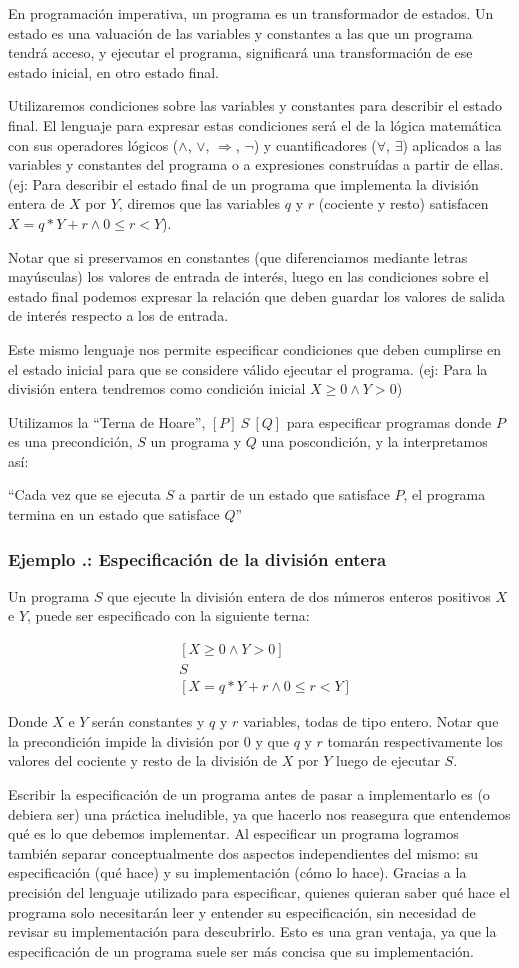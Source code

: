 \documentclass[12pt, a4paper, openany, fleqn]{book}
\newcounter{example}[chapter]
\renewcommand{\theexample}{\thechapter.\arabic{example}}
\newcommand{\example}[1]{
  \refstepcounter{example} %
  \subsubsection*{Ejemplo \theexample: #1}
}
\newcommand{\hoare}[3]{\ensuremath{[#1]\ #2\ [#3]}}
\newcommand{\verticalHoare}[3]{
    \begin{align*}
        &[#1]\\
        &#2\\
        &[#3]
    \end{align*}
}
\begin{document}
    En programación imperativa, un programa es un transformador de estados. Un estado es una valuación de las variables y constantes a las que un programa tendrá acceso, y ejecutar el programa, significará una transformación de ese estado inicial, en otro estado final.

    Utilizaremos condiciones sobre las variables y constantes para describir el estado final.
    El lenguaje para expresar estas condiciones será el de la lógica matemática con sus operadores lógicos ($\land$, $\lor$, $\Rightarrow$, $\neg$) y cuantificadores ($\forall$, $\exists$) aplicados a las variables y constantes del programa o a expresiones construídas a partir de ellas. (ej: Para describir el estado final de un programa que implementa la división entera de $X$ por $Y$, diremos que las variables $q$ y $r$ (cociente y resto) satisfacen $X = q * Y + r \land 0 \leqslant r < Y$).

    Notar que si preservamos en constantes (que diferenciamos mediante letras mayúsculas) los valores de entrada de interés, luego en las condiciones sobre el estado final podemos expresar la relación que deben guardar los valores de salida de interés respecto a los de entrada.

    Este mismo lenguaje nos permite especificar condiciones que deben cumplirse en el estado inicial para que se considere válido ejecutar el programa. (ej: Para la división entera tendremos como condición inicial $X \geqslant 0 \land Y > 0$)

    Utilizamos la ``Terna de Hoare'', \hoare{P}{S}{Q} para especificar programas donde $P$ es una precondición, $S$ un programa y $Q$ una poscondición, y la interpretamos así:

    ``Cada vez que se ejecuta $S$ a partir de un estado que satisface $P$, el programa termina en un estado que satisface $Q$''

    \example{Especificación de la división entera}
    \label{esp:division-entera}

    Un programa $S$ que ejecute la división entera de dos números enteros positivos $X$ e $Y$, puede ser especificado con la siguiente terna:
    \verticalHoare{X \geqslant 0 \land Y > 0}{S}{X = q * Y + r \land 0 \leqslant r < Y}
    Donde $X$ e $Y$ serán constantes y $q$ y $r$ variables, todas de tipo entero.
    Notar que la precondición impide la división por $0$ y que $q$ y $r$ tomarán respectivamente los valores del cociente y resto de la división de $X$ por $Y$ luego de ejecutar $S$.

    Escribir la especificación de un programa antes de pasar a implementarlo es (o debiera ser) una práctica ineludible, ya que hacerlo nos reasegura que entendemos qué es lo que debemos implementar.
    Al especificar un programa logramos también separar conceptualmente dos aspectos independientes del mismo: su especificación (qué hace) y su implementación (cómo lo hace).
    Gracias a la precisión del lenguaje utilizado para especificar, quienes quieran saber qué hace el programa solo necesitarán leer y entender su especificación, sin necesidad de revisar su implementación para descubrirlo. Esto es una gran ventaja, ya que la especificación de un programa suele ser más concisa que su implementación.
\end{document}
